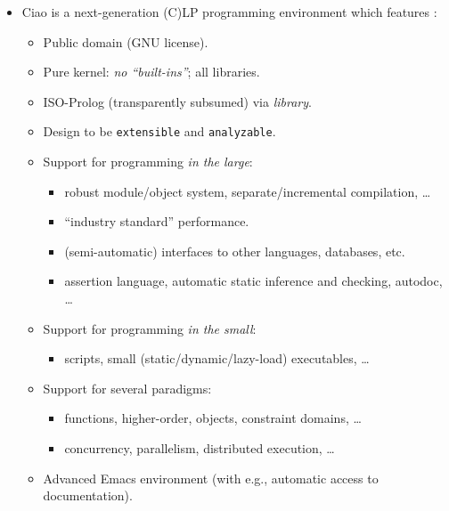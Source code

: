 \documentclass{article}
\renewcommand{\_}{\char'137}
\begin{document}
\begin{itemize}
\item Ciao is a next-generation (C)LP programming environment which features
  \cite{ciao-manual-1.10-short}:
  \begin{itemize}
  \item Public domain (GNU license).
  \item Pure kernel: \emph{no ``built-ins''}; all libraries.
  \item ISO-Prolog (transparently subsumed) via \emph{library}. 
  \item Design to be \texttt{extensible} and \texttt{analyzable}.
  \item Support for programming \emph{in the large}:
    \begin{itemize}
    \item robust module/object system, separate/incremental
      compilation, \ldots
    \item ``industry standard'' performance.
    \item (semi-automatic) interfaces to other languages, databases, etc.
    \item assertion language, automatic static inference and
      checking, autodoc, \ldots
    \end{itemize}
  \item Support for programming \emph{in the small}:
    \begin{itemize}
    \item scripts, small (static/dynamic/lazy-load) executables, \ldots
    \end{itemize}
  \item Support for several paradigms:
        \begin{itemize}
        \item functions, higher-order, objects, constraint
          domains, \ldots
        \item concurrency, parallelism, distributed execution, \ldots
        \end{itemize}
  \item Advanced Emacs environment (with e.g., automatic access to
    documentation). 
  \end{itemize}


\end{itemize}
\end{document}
